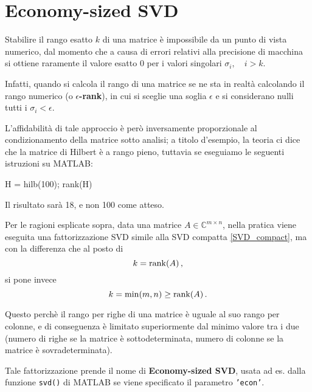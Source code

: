 \section{Economy-sized SVD}
\label{sec:SVD_econ}
Stabilire il rango esatto $k$ di una matrice è impossibile da un punto di vista 
numerico, dal momento che a causa di errori relativi alla precisione di macchina 
si ottiene raramente il valore esatto 0 per i valori singolari $\sigma_i, \quad 
i > k$.

Infatti, quando si calcola il rango di una matrice se ne sta in realtà 
calcolando il rango numerico (o \textbf{$\epsilon$-rank}), in cui si sceglie una 
soglia $\epsilon$ e si considerano nulli tutti i $\sigma_i < \epsilon$.

L'affidabilità di tale approccio è però inversamente proporzionale al 
condizionamento della matrice sotto analisi; a titolo d'esempio, la teoria ci 
dice che la matrice di Hilbert è a rango pieno, tuttavia se eseguiamo le 
seguenti istruzioni su MATLAB:

\begin{programma}
H = hilb(100);
rank(H)
\end{programma}

Il risultato sarà 18, e non 100 come atteso.

Per le ragioni esplicate sopra, data una matrice $A \in \mathbb{C}^{m \times 
n}$, nella pratica viene eseguita una fattorizzazione SVD simile alla SVD 
compatta \eqref{SVD_compact}, ma con la differenza che al posto di
\begin{equation*}
k = \operatorname{rank}(A) \,,
\end{equation*}
si pone invece
\begin{equation*}
k = \min(m,n) \geq \operatorname{rank}(A) \,.
\end{equation*}

Questo perchè il rango per righe di una matrice è uguale al suo rango per 
colonne, e di conseguenza è limitato superiormente dal minimo valore tra i due 
(numero di righe se la matrice è sottodeterminata, numero di colonne se la 
matrice è sovradeterminata).

Tale fattorizzazione prende il nome di \textbf{Economy-sized SVD}, usata ad es. 
dalla funzione \texttt{svd()} di MATLAB se viene specificato il parametro 
\texttt{'econ'}.